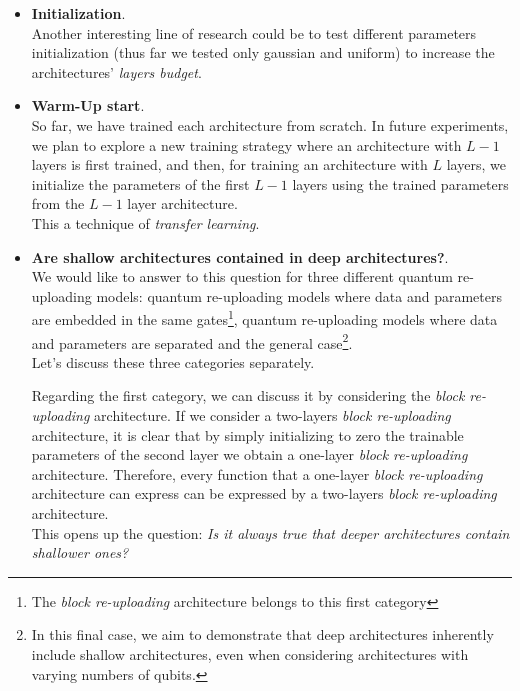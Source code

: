 \begin{itemize}
    \item \textbf{Initialization}.\\
    Another interesting line of research could be to test different parameters initialization (thus far
    we tested only gaussian and uniform) to increase the architectures' \textit{layers budget}.
    
    \item \textbf{Warm-Up start}.\\
    So far, we have trained each architecture from scratch. In future experiments, we plan to explore 
    a new training strategy where an architecture with $L-1$ layers is first trained, and then, 
    for training an architecture with $L$ layers, we initialize the parameters of the first $L-1$ 
    layers using the trained parameters from the $L-1$ layer architecture.\\
    This a technique of \textit{transfer learning}.

    \item \textbf{Are shallow architectures contained in deep architectures?}.\\
    We would like to answer to this question for three different quantum re-uploading models:
    quantum re-uploading models where data and parameters are embedded in the same gates\footnote[1]{The 
    \textit{block re-uploading} architecture belongs to this first category}, 
    quantum re-uploading models where data and parameters are separated and the general 
    case\footnote[2]{In this final case, we aim to demonstrate that deep architectures inherently 
    include shallow architectures, even when considering architectures with varying numbers of qubits.}.\\
    Let's discuss these three categories separately.

    Regarding the first category, we can discuss it by considering the \textit{block re-uploading} 
    architecture.
    If we consider a two-layers \textit{block re-uploading} architecture, it is clear that by simply 
    initializing to zero the trainable parameters of the second layer we obtain a one-layer 
    \textit{block re-uploading} architecture.
    Therefore, every function that a one-layer \textit{block re-uploading} architecture can express can be 
    expressed by a two-layers \textit{block re-uploading} architecture.\\
    This opens up the question: \textit{Is it always true that deeper architectures contain 
    shallower ones?}\\
    

\end{itemize}
